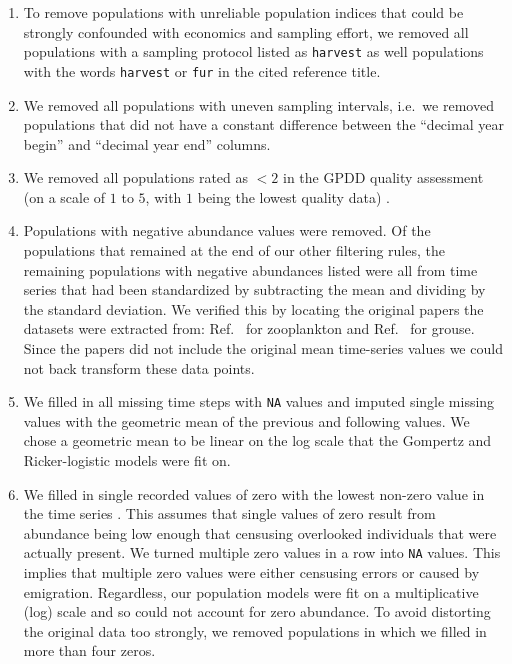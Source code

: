 \documentclass[12pt]{article}
\begin{document}
\begin{enumerate}

\item To remove populations with unreliable population indices that could be
  strongly confounded with economics and sampling effort, we removed all
  populations with a sampling protocol listed as \texttt{harvest} as well
  populations with the words \texttt{harvest} or \texttt{fur} in the cited
  reference title.

\item We removed all populations with uneven sampling intervals, i.e.\ we
  removed populations that did not have a constant difference between the
  ``decimal year begin'' and ``decimal year end'' columns.

\item We removed all populations rated as $< 2$ in the GPDD quality assessment
  (on a scale of $1$ to $5$, with $1$ being the lowest quality data)
  \cite{sibly2005, ziebarth2010}.

\item Populations with negative abundance values were removed. Of the
  populations that remained at the end of our other filtering rules, the
  remaining populations with negative abundances listed were all from time
  series that had been standardized by subtracting the mean and dividing by the
  standard deviation. We verified this by locating the original papers the
  datasets were extracted from: Ref.~\cite{colebrook1978} for zooplankton and
  Ref.~\cite{lindstrom1995} for grouse. Since the papers did not include the
  original mean time-series values we could not back transform these data
  points.

\item We filled in all missing time steps with \texttt{NA} values and imputed
  single missing values with the geometric mean of the previous and following
  values. We chose a geometric mean to be linear on the log scale that the
  Gompertz and Ricker-logistic models were fit on.

\item We filled in single recorded values of zero with the lowest non-zero
  value in the time series \cite{brook2006a}. This assumes that
  single values of zero result from abundance being low enough that censusing
  overlooked individuals that were actually present. We turned multiple zero
  values in a row into \texttt{NA} values. This implies that multiple zero
  values were either censusing errors or caused by emigration. Regardless, our
  population models were fit on a multiplicative (log) scale and so could not
  account for zero abundance. To avoid distorting the original data too
  strongly, we removed populations in which we filled in more than four zeros.


\end{enumerate}
\end{document}
